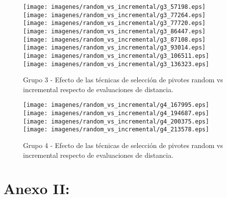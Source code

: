 \begin{figure}[h!]
\centering
{\texttt{[image: imagenes/random\_vs\_incremental/g3\_57198.eps]}}
{\texttt{[image: imagenes/random\_vs\_incremental/g3\_77264.eps]}}
{\texttt{[image: imagenes/random\_vs\_incremental/g3\_77720.eps]}}
{\texttt{[image: imagenes/random\_vs\_incremental/g3\_86447.eps]}}
{\texttt{[image: imagenes/random\_vs\_incremental/g3\_87108.eps]}}
{\texttt{[image: imagenes/random\_vs\_incremental/g3\_93014.eps]}}
{\texttt{[image: imagenes/random\_vs\_incremental/g3\_106511.eps]}}
{\texttt{[image: imagenes/random\_vs\_incremental/g3\_136323.eps]}}
\caption{\small Grupo 3 - Efecto de las t\'ecnicas de selecci\'on de pivotes random vs incremental respecto de evaluaciones de distancia.}
\end{figure}

\begin{figure}[h!]
\centering
{\texttt{[image: imagenes/random\_vs\_incremental/g4\_167995.eps]}}
{\texttt{[image: imagenes/random\_vs\_incremental/g4\_194687.eps]}}
{\texttt{[image: imagenes/random\_vs\_incremental/g4\_200375.eps]}}
{\texttt{[image: imagenes/random\_vs\_incremental/g4\_213578.eps]}}
\caption{\small Grupo 4 - Efecto de las t\'ecnicas de selecci\'on de pivotes random vs incremental respecto de evaluaciones de distancia.}
\end{figure}
\chapter{Anexo II: }
